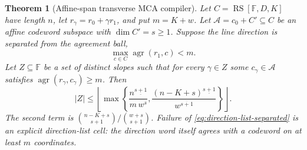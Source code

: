 \documentclass[11pt,a4paper]{amsart}
\numberwithin{equation}{section}
\newtheorem{theorem}{Theorem}[section]
\theoremstyle{remark}
\DeclareMathOperator{\RS}{RS}\DeclareMathOperator{\MCA}{MCA}\DeclareMathOperator{\CA}{CA}
\newcommand{\F}{\mathbb F}\newcommand{\B}{\mathbb B}\newcommand{\K}{\mathbb K}\newcommand{\Z}{\mathbb Z}
\begin{document}
\begin{theorem}[Affine-span transverse MCA compiler]
\label{thm:affine-span-mca}
Let \(C=\RS[\F,D,K]\) have length \(n\), let
\(r_\gamma=r_0+\gamma r_1\), and put \(m=K+w\).  Let
\(\mathcal A=c_0+C'\subseteq C\) be an affine codeword subspace with
\(\dim C'=s\ge1\).  Suppose the line direction is separated from the
agreement ball,
\begin{equation}
 \max_{c\in C}\operatorname{agr}(r_1,c)<m.
 \label{eq:direction-list-separated}
\end{equation}
Let \(Z\subseteq\F\) be a set of distinct slopes such that for every
\(\gamma\in Z\) some \(c_\gamma\in\mathcal A\) satisfies
\(\operatorname{agr}(r_\gamma,c_\gamma)\ge m\).  Then
\begin{equation}
 |Z|\le
 \left\lfloor
 \max\left\{
 \frac{n^{\underline{s+1}}}
      {m\,w^{\overline s}},
 \frac{(n-K+s)^{\underline{s+1}}}
      {w^{\overline{s+1}}}
 \right\}
 \right\rfloor .
 \label{eq:affine-span-mca}
\end{equation}
The second term is
\(\binom{n-K+s}{s+1}/\binom{w+s}{s+1}\).  Failure of
\eqref{eq:direction-list-separated} is an explicit direction-list cell:
the direction word itself agrees with a codeword on at least \(m\)
coordinates.
\end{theorem}
\end{document}
